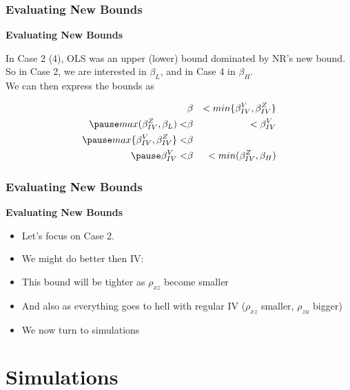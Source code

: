 \documentclass{beamer}
\begin{document}
\begin{frame}
\frametitle{Evaluating New Bounds}
\textbf{Evaluating New Bounds} \\ \bigskip \pause

In Case 2 (4), OLS was an upper (lower) bound dominated by NR's new bound. \\ \pause
So in Case 2, we are interested in $\beta_{L}$, and in Case 4 in $\beta_{H}$. \\ \pause
We can then express the bounds as  \\ \pause

\begin{eqnarray*}
     &\beta&<min\{\beta_{IV}^V,\beta_{IV}^Z\} \\  \pause
     max(\beta_{IV}^Z,\beta_L)<&\beta&<\beta_{IV}^V \\ \pause
     max\{\beta_{IV}^V,\beta_{IV}^Z\}<&\beta& \\ \pause
     \beta_{IV}^V<&\beta&<min(\beta_{IV}^Z,\beta_H)
\end{eqnarray*}

\end{frame}

\begin{frame}
\frametitle{Evaluating New Bounds}
\textbf{Evaluating New Bounds} \\ \bigskip \pause

\begin{itemize}
  \item Let's focus on Case 2. \\ \pause
  \item We might do better then IV: \\ \pause
  \item This bound will be tighter as $\rho_{xz}$ become smaller \pause
  \item And also as everything goes to hell with regular IV ($\rho_{xz}$ smaller, $\rho_{zu}$ bigger) \pause
  \item We now turn to simulations
\end{itemize}

\end{frame}

\section{Simulations}
\end{document}
